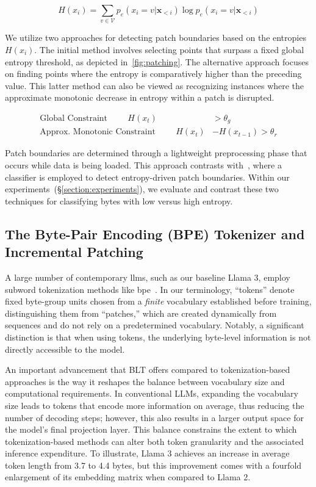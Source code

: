 \begin{equation}
H(x_i) = \sum_{v \in \mathcal{V}} p_{e}(x_i=v|\pmb{x}_{<i}) \log p_{e}(x_i=v|\pmb{x}_{<i})
\end{equation}

We utilize two approaches for detecting patch boundaries based on the entropies $H(x_i)$. The initial method involves selecting points that surpass a fixed global entropy threshold, as depicted in~\autoref{fig:patching}. The alternative approach focuses on finding points where the entropy is comparatively higher than the preceding value. This latter method can also be viewed as recognizing instances where the approximate monotonic decrease in entropy within a patch is disrupted.

\begin{align*}
    \text{Global Constraint}\hspace{1cm}H(x_t)& > \theta_g\\
    \text{Approx. Monotonic Constraint}\hspace{1cm}H(x_t)& - H(x_{t-1}) > \theta_r
\end{align*}

Patch boundaries are determined through a lightweight preprocessing phase that occurs while data is being loaded. This approach contrasts with~\citet{nawrot-etal-2023-efficient}, where a classifier is employed to detect entropy-driven patch boundaries. Within our experiments~(\S\ref{section:experiments}), we evaluate and contrast these two techniques for classifying bytes with low versus high entropy.

\subsection{The Byte-Pair Encoding (BPE) Tokenizer and Incremental Patching}
\label{section:incremental-patching}
\label{section:bpe-patch}

A large number of contemporary llms, such as our baseline Llama 3, employ subword tokenization methods like bpe~\citep{gage1994new, sennrich-etal-2016-neural}. In our terminology, ``tokens'' denote fixed byte-group units chosen from a \textit{finite} vocabulary established before training, distinguishing them from ``patches,'' which are created dynamically from sequences and do not rely on a predetermined vocabulary. Notably, a significant distinction is that when using tokens, the underlying byte-level information is not directly accessible to the model.

An important advancement that {\textsc BLT} offers compared to tokenization-based approaches is the way it reshapes the balance between vocabulary size and computational requirements. In conventional LLMs, expanding the vocabulary size leads to tokens that encode more information on average, thus reducing the number of decoding steps; however, this also results in a larger output space for the model’s final projection layer. This balance constrains the extent to which tokenization-based methods can alter both token granularity and the associated inference expenditure. To illustrate, Llama 3 achieves an increase in average token length from 3.7 to 4.4 bytes, but this improvement comes with a fourfold enlargement of its embedding matrix when compared to Llama 2.

